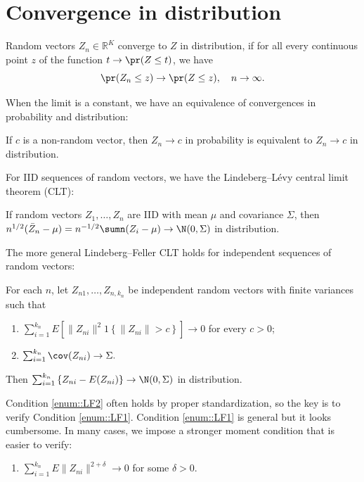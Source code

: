 \section{Convergence in distribution}


\begin{definition}
Random vectors $Z_{n}\in\mathbb{R}^{K}$ converge to $Z$ in distribution,
if for all every continuous point $z$ of the function $t\rightarrow\pr(Z\leq t)$, we have 
\[
\pr(Z_{n}\leq z)\rightarrow\pr(Z\leq z),\quad n\rightarrow\infty.
\]
\end{definition}

When the limit is a constant, we have an equivalence of convergences
in probability and distribution:

\begin{proposition}
If $c$ is a non-random vector, then $Z_{n}\rightarrow c$ in probability
is equivalent to $Z_{n}\rightarrow c$ in distribution.
\end{proposition}


For IID sequences of random vectors, we have the Lindeberg--L\'{e}vy central limit theorem
(CLT):
\begin{proposition}
If random vectors $Z_{1},\ldots,Z_{n}$ are \textup{IID} with mean $\mu$
and covariance $\Sigma$, then $n^{1/2}(\bar{Z}_{n}-\mu)=n^{-1/2}\sumn(Z_{i}-\mu)\rightarrow\N(0,\Sigma)$
in distribution. 
\end{proposition}


The more general Lindeberg--Feller CLT holds for independent sequences
of random vectors:
\begin{proposition}\label{prop::lf-clt}
For each $n$, let $Z_{n1},\ldots,Z_{n,k_{n}}$ be independent random
vectors with finite variances such that
\begin{enumerate}[label=(LF\arabic*), ref=LF\arabic*]
\item\label{enum::LF1} $\sum_{i=1}^{k_{n}}E\left[\|Z_{ni}\|^{2}1\left\{ \|Z_{ni}\|>c\right\} \right]\rightarrow0$
for every $c>0$;
\item\label{enum::LF2} $\sum_{i=1}^{k_{n}}\cov(Z_{ni})\rightarrow\Sigma.$ 
\end{enumerate}
Then $\sum_{i=1}^{k_{n}}\left\{ Z_{ni}-E(Z_{ni})\right\} \rightarrow\N(0,\Sigma)$
in distribution.
\end{proposition}


Condition \eqref{enum::LF2} often holds by proper standardization, so the key is to verify Condition \eqref{enum::LF1}. 
Condition \eqref{enum::LF1} is general but it looks cumbersome. 
In many cases, we impose a stronger moment condition that is easier to verify:
\begin{enumerate}[label=(LF\arabic*'), ref=LF\arabic*']
\item\label{enum::LF'1} 
$\sum_{i=1}^{k_{n}}E \|Z_{ni}\|^{2+\delta} \rightarrow 0$ for some $\delta >0$. 
\end{enumerate}

